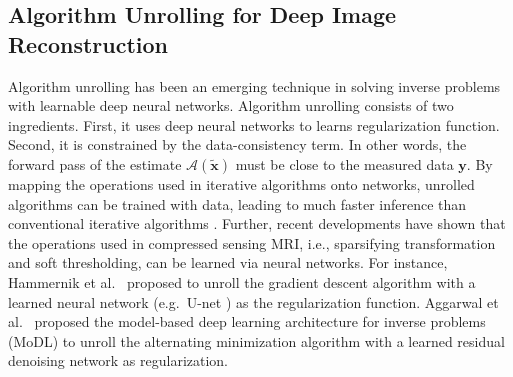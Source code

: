 \documentclass[journal,twoside,web]{ieeecolor}
\begin{document}
%


	\subsection{Algorithm Unrolling for Deep Image Reconstruction}

	Algorithm unrolling has been an emerging technique
	in solving inverse problems with learnable deep neural networks.
	Algorithm unrolling consists of two ingredients.
	First, it uses deep neural networks to learns regularization function.
	Second, it is constrained
	by the data-consistency term.
	In other words,
	the forward pass of the estimate $\mathcal{A} (\mathbf{\tilde{x}})$
	must be close to the measured data $\mathbf{y}$.
	By mapping the operations used in iterative algorithms
	onto networks, unrolled algorithms can be trained with data,
	leading to much faster inference
	than conventional iterative algorithms \cite{monga_2021_algunroll}.
	Further, recent developments have shown that
	the operations used in compressed sensing MRI,
	i.e., sparsifying transformation and soft thresholding,
	can be learned via neural networks.
	For instance, Hammernik et al.~\cite{hammernik_2018_varnet}
	proposed to unroll the gradient descent algorithm
	with a learned neural network
	(e.g.~U-net \cite{ronneberger_2015_unet})
	as the regularization function.
	Aggarwal et al.~\cite{aggarwal_2018_modl} proposed
	the model-based deep learning architecture for inverse problems (MoDL)
	to unroll the alternating minimization algorithm
	with a learned residual denoising network \cite{he_2016_resnet}
	as regularization.
\end{document}
